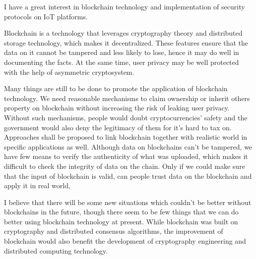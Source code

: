 


\begin{cvletter}



    I have a great interest in blockchain technology and implementation of security protocols on IoT platforms.

    Blockchain is a technology that leverages cryptography theory and distributed storage technology, which makes it decentralized. These features ensure that the data on it cannot be tampered and less likely to lose, hence it may do well in documenting the facts. At the same time, user privacy may be well protected with the help of asymmetric cryptosystem.

    Many things are still to be done to promote the application of blockchain technology. We need reasonable mechanisms to claim ownership or inherit others property on blockchain without increasing the risk of leaking user privacy. Without such mechanisms, people would doubt cryptocurrencies' safety and the government would also deny the legitimacy of them for it's hard to tax on. Approaches shall be proposed to link blockchain together with realistic world in specific applications as well. Although data on blockchains can't be tampered, we have few means to verify the authenticity of what was uploaded, which makes it difficult to check the integrity of data on the chain. Only if we could make sure that the input of blockchain is valid, can people trust data on the blockchain and apply it in real world,

    I believe that there will be some new situations which couldn't be better without blockchains in the future, though there seem to be few things that we can do better using blockchain technology at present. While blockchain was built on cryptography and distributed consensus algorithms, the improvement of blockchain would also benefit the development of cryptography engineering and distributed computing technology.


\end{cvletter}

